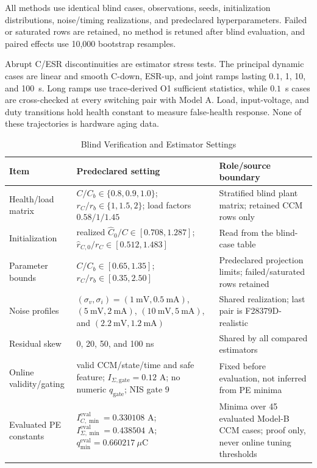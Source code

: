 All methods use identical blind cases, observations, seeds, initialization distributions, noise/timing realizations, and predeclared hyperparameters. Failed or saturated rows are retained, no method is retuned after blind evaluation, and paired effects use 10,000 bootstrap resamples.

Abrupt C/ESR discontinuities are estimator stress tests. The principal dynamic cases are linear and smooth C-down, ESR-up, and joint ramps lasting $0.1$, 1, 10, and 100~s. Long ramps use trace-derived O1 sufficient statistics, while $0.1$~s cases are cross-checked at every switching pair with Model A. Load, input-voltage, and duty transitions hold health constant to measure false-health response. None of these trajectories is hardware aging data.

\begin{table}[t]
\caption{Blind Verification and Estimator Settings}
\label{tab:verification_settings}
\centering
\footnotesize
\setlength{\tabcolsep}{4pt}
\begin{tabular}{p{3.0cm}p{6.0cm}p{6.6cm}}
\toprule
Item & Predeclared setting & Role/source boundary \\
\midrule
Health/load matrix & $C/C_b\in\{0.8,0.9,1.0\}$; $r_C/r_b\in\{1,1.5,2\}$; load factors $0.58/1/1.45$ & Stratified blind plant matrix; retained CCM rows only \\
Initialization & realized $\hat C_0/C\in[0.708,1.287]$; $\hat r_{C,0}/r_C\in[0.512,1.483]$ & Read from the blind-case table \\
Parameter bounds & $C/C_b\in[0.65,1.35]$; $r_C/r_b\in[0.35,2.50]$ & Predeclared projection limits; failed/saturated rows retained \\
Noise profiles & $(\sigma_v,\sigma_i)=(1~\mathrm{mV},0.5~\mathrm{mA})$, $(5~\mathrm{mV},2~\mathrm{mA})$, $(10~\mathrm{mV},5~\mathrm{mA})$, and $(2.2~\mathrm{mV},1.2~\mathrm{mA})$ & Shared realization; last pair is F28379D-realistic \\
Residual skew & 0, 20, 50, and 100 ns & Shared by all compared estimators \\
Online validity/gating & valid CCM/state/time and safe feature; $I_{\Sigma,\mathrm{gate}}=0.12$ A; no numeric $q_{\mathrm{gate}}$; \TSKF{} NIS gate 9 & Fixed before evaluation, not inferred from PE minima \\
Evaluated PE constants & $I_{C,\min}^{\mathrm{eval}}=0.330108$ A; $I_{\Sigma,\min}^{\mathrm{eval}}=0.438504$ A; $q_{\min}^{\mathrm{eval}}=0.660217~\mu$C & Minima over 45 evaluated Model-B CCM cases; proof only, never online tuning thresholds \\

\end{tabular}
\end{table}
